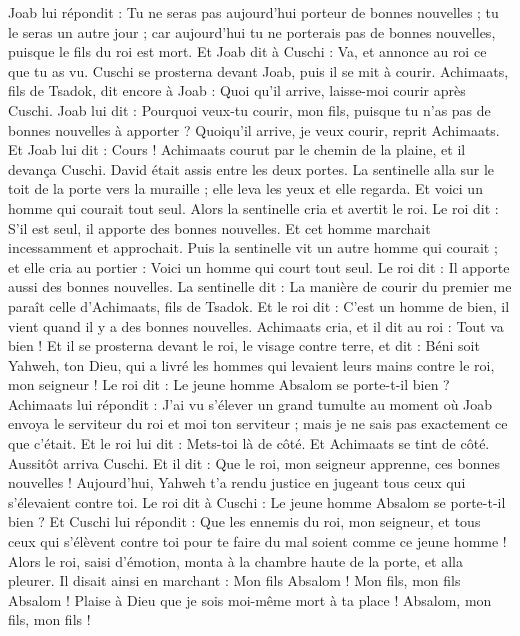\begin{multicols}{2}
Joab lui répondit : Tu ne seras pas aujourd'hui porteur de bonnes nouvelles ; tu le seras un autre jour ; car aujourd'hui tu ne porterais pas de bonnes nouvelles, puisque le fils du roi est mort.
Et Joab dit à Cuschi : Va, et annonce au roi ce que tu as vu. Cuschi se prosterna devant Joab, puis il se mit à courir.
Achimaats, fils de Tsadok, dit encore à Joab : Quoi qu'il arrive, laisse-moi courir après Cuschi. Joab lui dit : Pourquoi veux-tu courir, mon fils, puisque tu n'as pas de bonnes nouvelles à apporter ?
Quoiqu'il arrive, je veux courir, reprit Achimaats. Et Joab lui dit : Cours ! Achimaats courut par le chemin de la plaine, et il devança Cuschi.
David était assis entre les deux portes. La sentinelle alla sur le toit de la porte vers la muraille ; elle leva les yeux et elle regarda. Et voici un homme qui courait tout seul.
Alors la sentinelle cria et avertit le roi. Le roi dit : S'il est seul, il apporte des bonnes nouvelles. Et cet homme marchait incessamment et approchait.
Puis la sentinelle vit un autre homme qui courait ; et elle cria au portier : Voici un homme qui court tout seul. Le roi dit : Il apporte aussi des bonnes nouvelles.
La sentinelle dit : La manière de courir du premier me paraît celle d'Achimaats, fils de Tsadok. Et le roi dit : C'est un homme de bien, il vient quand il y a des bonnes nouvelles.
Achimaats cria, et il dit au roi : Tout va bien ! Et il se prosterna devant le roi, le visage contre terre, et dit : Béni soit Yahweh, ton Dieu, qui a livré les hommes qui levaient leurs mains contre le roi, mon seigneur !
Le roi dit : Le jeune homme Absalom se porte-t-il bien ? Achimaats lui répondit : J'ai vu s'élever un grand tumulte au moment où Joab envoya le serviteur du roi et moi ton serviteur ; mais je ne sais pas exactement ce que c'était.
Et le roi lui dit : Mets-toi là de côté. Et Achimaats se tint de côté.
Aussitôt arriva Cuschi. Et il dit : Que le roi, mon seigneur apprenne, ces bonnes nouvelles ! Aujourd'hui, Yahweh t'a rendu justice en jugeant tous ceux qui s'élevaient contre toi.
Le roi dit à Cuschi : Le jeune homme Absalom se porte-t-il bien ? Et Cuschi lui répondit : Que les ennemis du roi, mon seigneur, et tous ceux qui s'élèvent contre toi pour te faire du mal soient comme ce jeune homme !
Alors le roi, saisi d'émotion, monta à la chambre haute de la porte, et alla pleurer. Il disait ainsi en marchant : Mon fils Absalom ! Mon fils, mon fils Absalom ! Plaise à Dieu que je sois moi-même mort à ta place ! Absalom, mon fils, mon fils !

\end{multicols}

